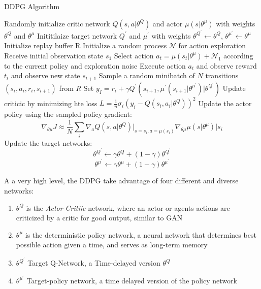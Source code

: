 \documentclass[man, 12pt]{apa6}
\begin{document}
\begin{algorithm}[H]
\caption{DDPG Algorithm \citep{DDPG}}
\begin{algorithmic}[1]
\State Randomly initialize critic network $Q(s, a \vert \theta^{Q})$ and actor $\mu(s \vert \theta^{\mu})$ with weights $\theta^{Q}$ and $\theta^{\mu}$
\State Inititilaize target network $Q^{\prime}$ and $\mu^{\prime}$ with weights $\theta^{Q^{\prime}} \leftarrow \theta^{Q}$, $\theta^{\mu^{\prime}} \leftarrow \theta^{\mu}$
\State Initialize replay buffer R
	\State Initialize  a random process $\mathcal{N}$ for action exploration 
	\State Receive initial observation state $s_{1}$
		\State Select action $a_{t}= \mu(s_{t} \vert \theta^{\mu}) + \mathcal{N}_{1}$ according to the current policy and exploration noise
		\State Execute action $a_{t}$ and observe reward $t_{t}$ and observe new state $s_{t+1}$ 
		\State Sample a random minibatch of $N$ transitions $(s_{i}, a_{i}, r_{i}, s_{i+1})$ from $R$
		\State Set $y_{I} = r_{i} + \gamma Q^{\prime}(s_{i+1}, \mu^{\prime}(s_{i+1} \vert \theta^{\mu^{\prime}} ) \vert \theta^{Q^{\prime}})$
		\State Update criticic by minimizing hte loss $L= \frac{1}{n}\sigma_{i}(y_{i}-Q(s_{i},a_{i} \vert \theta^{Q}))^{2}$
		\State Update the actor policy using the sampled policy gradient: \[ \nabla_{\theta \mu} J \approx \frac{1}{N} \sum_{i} \nabla_{a} Q(s, a \vert \theta^{Q}) \vert_{s=s_{i}, a = \mu (s_{i})}  \nabla_{\theta\mu} \mu(s \vert \theta ^{\mu}) \vert s_{i} \]
		\State Update the target networks: 
			\[\theta^{Q^{\prime}} \leftarrow \gamma\theta^{Q} + (1- \gamma)\theta^{Q^{\prime}} \] 
			\[ 			\theta^{\mu^{\prime}} \leftarrow \gamma\theta^{\mu} + (1- \gamma)\theta^{\mu^{\prime}}  \]
	\EndFor
\EndFor
\end{algorithmic}
\end{algorithm}


A a very high level, the  DDPG take advantage of four different and diverse networks: \begin{enumerate}
\item $\theta^{Q}$  is the \emph{Actor-Critiic} network, where an actor or agents actions are criticized by a critic for good output, similar to GAN
\item $\theta^{\mu}$ is the deterministic policy network, a neural network that determines best possible action given a time, and serves as long-term memory
\item $\theta^{Q^{\prime}}$ Target Q-Network, a Time-delayed version $\theta^{Q}$
\item $\theta^{\mu^{\prime}}$ Target-policy network, a time delayed version of the policy network
\end{enumerate} 
\end{document}
